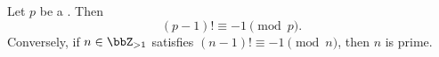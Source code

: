 \begin{theorem} \label{theorem:wilsons_theorem}
    Let $p$ be a . Then
    $$(p-1)! \equiv -1 \pmod{p}.$$
    Conversely, if $n \in \bbZ_{>1}$ satisfies $(n-1)! \equiv -1 \pmod{n}$, then $n$ is prime.
\end{theorem}
